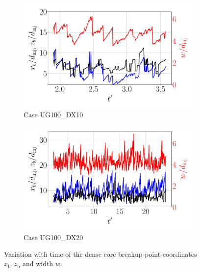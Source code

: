 \begin{figure}[ht]
\begin{subfigure}[b]{0.45\textwidth}
	\centering
   \includegraphics[scale=0.25]{./part2_developments/figures_ch5_resolved_JICF/results_dense_core_modeling/instant_xb_zb_w_UG100_DX10}
   \vspace*{-0.30in}
   \caption{Case UG100\_DX10}
   \label{fig:instant_xb_zb_w_UG100_DX10} 
\end{subfigure}
\hfill
\begin{subfigure}[b]{0.45\textwidth}
	\centering
   \includegraphics[scale=0.25]{./part2_developments/figures_ch5_resolved_JICF/results_dense_core_modeling/instant_xb_zb_w_UG100_DX20}
   \vspace*{-0.30in}
   \caption{Case UG100\_DX20}
   \label{fig:instant_xb_zb_w_UG100_DX20}
\end{subfigure}
	\vspace*{-0.1in}
   \caption{Variation with time of the dense core breakup point coordinates $x_\mathrm{b}, z_\mathrm{b}$ and width $w$.}

\label{fig:JICF_xb_zb_w_evolution}
\end{figure}


